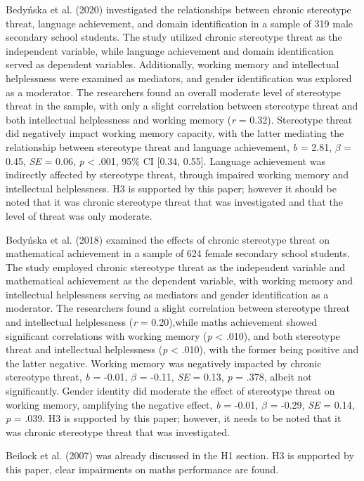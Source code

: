 \documentclass[
  stu, a4paper, 12pt,mask,floatsintext]{apa7}
\begin{document}
Bedyńska et al. (2020) investigated the relationships between chronic stereotype threat, language achievement, and domain identification in a sample of 319 male secondary school students.
The study utilized chronic stereotype threat as the independent variable, while language achievement and domain identification served as dependent variables. Additionally, working memory and intellectual helplessness were examined as mediators, and gender identification was explored as a moderator.
The researchers found an overall moderate level of stereotype threat in the sample, with only a slight correlation between stereotype threat and both intellectual helplessness and working memory (\emph{r} = 0.32).
Stereotype threat did negatively impact working memory capacity, with the latter mediating the relationship between stereotype threat and language achievement, \emph{b} = 2.81, \(\beta\) = 0.45, \emph{SE} = 0.06, \emph{p} \textless{} .001, 95\% CI {[}0.34, 0.55{]}.
Language achievement was indirectly affected by stereotype threat, through impaired working memory and intellectual helplessness.
H3 is supported by this paper; however it should be noted that it was chronic stereotype threat that was investigated and that the level of threat was only moderate.

Bedyńska et al. (2018) examined the effects of chronic stereotype threat on mathematical achievement in a sample of 624 female secondary school students.
The study employed chronic stereotype threat as the independent variable and mathematical achievement as the dependent variable, with working memory and intellectual helplessness serving as mediators and gender identification as a moderator.
The researchers found a slight correlation between stereotype threat and intellectual helplessness (\emph{r} = 0.20),while maths achievement showed significant correlations with working memory (\emph{p} \textless{} .010), and both stereotype threat and intellectual helplessness (\emph{p} \textless{} .010), with the former being positive and the latter negative.
Working memory was negatively impacted by chronic stereotype threat, \emph{b} = -0.01, \(\beta\) = -0.11, \emph{SE} = 0.13, \emph{p} = .378, albeit not significantly.
Gender identity did moderate the effect of stereotype threat on working memory, amplifying the negative effect, \emph{b} = -0.01, \(\beta\) = -0.29, \emph{SE} = 0.14, \emph{p} = .039.
H3 is supported by this paper; however, it needs to be noted that it was chronic stereotype threat that was investigated.

Beilock et al. (2007) was already discussed in the H1 section.
H3 is supported by this paper, clear impairments on maths performance are found.
\end{document}
